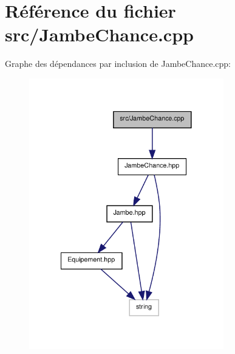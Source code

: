 \section{Référence du fichier src/\-Jambe\-Chance.cpp}
\label{_jambe_chance_8cpp}
Graphe des dépendances par inclusion de Jambe\-Chance.\-cpp\-:\nopagebreak
\begin{figure}[H]
\begin{center}
\leavevmode
\includegraphics[width=240pt]{_jambe_chance_8cpp__incl}
\end{center}
\end{figure}
